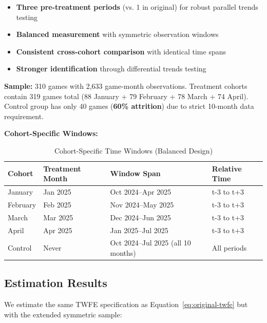 \documentclass[12pt,a4paper]{article}
\begin{document}
\begin{itemize}
    \item \textbf{Three pre-treatment periods} (vs. 1 in original) for robust parallel trends testing
    \item \textbf{Balanced measurement} with symmetric observation windows
    \item \textbf{Consistent cross-cohort comparison} with identical time spans
    \item \textbf{Stronger identification} through differential trends testing
\end{itemize}

\textbf{Sample:} 310 games with 2,633 game-month observations. Treatment cohorts contain 319 games total (88 January + 79 February + 78 March + 74 April). Control group has only 40 games (\textbf{60\% attrition}) due to strict 10-month data requirement.

\textbf{Cohort-Specific Windows:}

\begin{table}[H]
\centering
\caption{Cohort-Specific Time Windows (Balanced Design)}
\label{tab:cohort-windows}
\begin{tabular}{llll}
\toprule
\textbf{Cohort} & \textbf{Treatment Month} & \textbf{Window Span} & \textbf{Relative Time} \\
\midrule
January & Jan 2025 & Oct 2024--Apr 2025 & t-3 to t+3 \\
February & Feb 2025 & Nov 2024--May 2025 & t-3 to t+3 \\
March & Mar 2025 & Dec 2024--Jun 2025 & t-3 to t+3 \\
April & Apr 2025 & Jan 2025--Jul 2025 & t-3 to t+3 \\
Control & Never & Oct 2024--Jul 2025 (all 10 months) & All periods \\
\bottomrule
\end{tabular}
\end{table}

\subsection{Estimation Results}

We estimate the same TWFE specification as Equation~\ref{eq:original-twfe} but with the extended symmetric sample:
\end{document}
